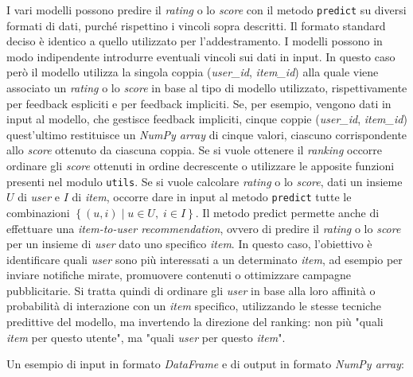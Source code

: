 I vari modelli possono predire il \textit{rating} o lo \textit{score} con il metodo \texttt{predict} su diversi formati di dati, purché rispettino i vincoli sopra descritti. Il formato standard deciso è identico a quello utilizzato per l'addestramento. I modelli possono in modo indipendente introdurre eventuali vincoli sui dati in input.
In questo caso però il modello utilizza la singola coppia (\textit{user\_id}, \textit{item\_id}) alla quale viene associato un \textit{rating} o lo \textit{score} in base al tipo di modello utilizzato, rispettivamente per feedback espliciti e per feedback impliciti. Se, per esempio, vengono dati in input al modello, che gestisce feedback impliciti, cinque coppie (\textit{user\_id}, \textit{item\_id}) quest'ultimo restituisce un \textit{NumPy array} di cinque valori, ciascuno corrispondente allo \textit{score} ottenuto da ciascuna coppia. Se si vuole ottenere il \textit{ranking} occorre ordinare gli \textit{score} ottenuti in ordine decrescente o utilizzare le apposite funzioni presenti nel modulo \texttt{utils}. Se si vuole calcolare \textit{rating} o lo \textit{score}, dati un insieme $U$ di \textit{user} e $I$ di \textit{item}, occorre dare in input al metodo \texttt{predict} tutte le combinazioni $\left\{(u, i) \mid u \in U,\; i \in I \right\}$. Il metodo predict permette anche di effettuare una \textit{item-to-user recommendation}, ovvero di predire il \textit{rating} o lo \textit{score} per un insieme di \textit{user} dato uno specifico \textit{item}. In questo caso, l’obiettivo è identificare quali \textit{user} sono più interessati a un determinato \textit{item}, ad esempio per inviare notifiche mirate, promuovere contenuti o ottimizzare campagne pubblicitarie. Si tratta quindi di ordinare gli \textit{user} in base alla loro affinità o probabilità di interazione con un \textit{item} specifico, utilizzando le stesse tecniche predittive del modello, ma invertendo la direzione del ranking: non più "quali \textit{item} per questo utente", ma "quali \textit{user} per questo \textit{item}".

Un esempio di input in formato \textit{DataFrame} e di output in formato \textit{NumPy array}:

